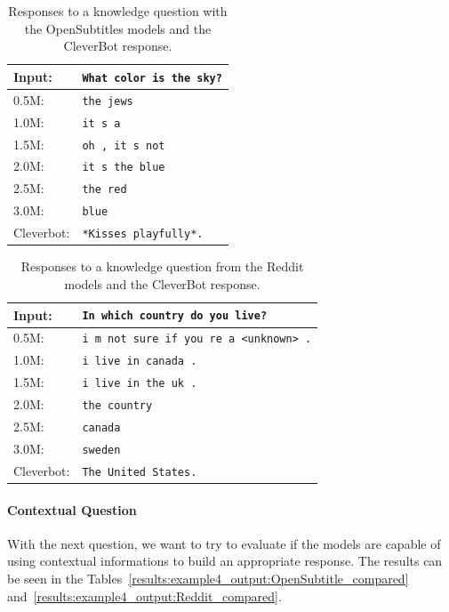 \begin{table}[H]
	\centering
	\begin{adjustbox}{max width=\textwidth}
		\begin{tabular}{ll}
			\toprule
			Input: 	& \texttt{What color is the sky?}\\
			\midrule
			0.5M: 	& \texttt{the jews}\\
			1.0M: 	& \texttt{it s a}\\
			1.5M:	& \texttt{oh , it s not}\\
			2.0M:	& \texttt{it s the blue}\\
			2.5M:	& \texttt{the red}\\
			3.0M:	& \texttt{blue}\\
			Cleverbot:&\texttt{*Kisses playfully*.}\\
			\bottomrule
		\end{tabular}
	\end{adjustbox}
	\caption{Responses to a knowledge question with the OpenSubtitles models and the CleverBot response.}
	\label{results:example3_output:OpenSubtitle_compared}
\end{table}
\begin{table}[H]
	\centering
	\begin{adjustbox}{max width=\textwidth}
		\begin{tabular}{ll}
			\toprule
			Input: 	& \texttt{In which country do you live?}\\
			\midrule
			0.5M: 	& \texttt{i m not sure if you re a <unknown> .}\\
			1.0M: 	& \texttt{i live in canada .}\\
			1.5M:	& \texttt{i live in the uk .}\\
			2.0M:	& \texttt{the country}\\
			2.5M:	& \texttt{canada}\\
			3.0M:	& \texttt{sweden}\\
			Cleverbot:&\texttt{The United States.}\\
			\bottomrule
		\end{tabular}
	\end{adjustbox}
	\caption{Responses to a knowledge question from the Reddit models and the CleverBot response.}
	\label{results:example3_output:Reddit_compared}
\end{table}

\paragraph{Contextual Question} 
With the next question, we want to try to evaluate if the models are capable of using contextual informations to build an appropriate response. The results can be seen in the Tables~\ref{results:example4_output:OpenSubtitle_compared} and~\ref{results:example4_output:Reddit_compared}.

